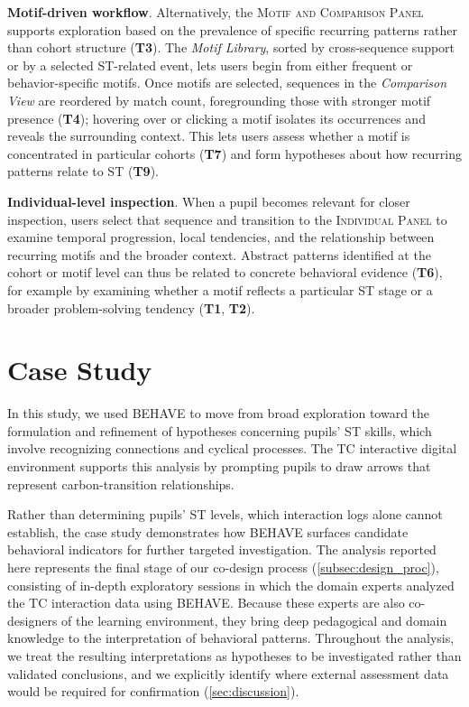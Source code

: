 \documentclass[letterpaper,journal]{IEEEtran}
\begin{document}
\noindent
\textbf{Motif-driven workflow}.
Alternatively, the \textsc{Motif and Comparison Panel} supports exploration based on the prevalence of specific recurring patterns rather than cohort structure (\textbf{T3}).
The \textit{Motif Library}, sorted by cross-sequence support or by a selected ST-related event, lets users begin from either frequent or behavior-specific motifs. 
Once motifs are selected, sequences in the \textit{Comparison View} are reordered by match count, foregrounding those with stronger motif presence (\textbf{T4}); hovering over or clicking a motif isolates its occurrences and reveals the surrounding context.
This lets users assess whether a motif is concentrated in particular cohorts (\textbf{T7}) and form hypotheses about how recurring patterns relate to ST (\textbf{T9}).

\noindent
\textbf{Individual-level inspection}.
When a pupil becomes relevant for closer inspection, users select that sequence and transition to the \textsc{Individual Panel} to examine temporal progression, local tendencies, and the relationship between recurring motifs and the broader context. 
Abstract patterns identified at the cohort or motif level can thus be related to concrete behavioral evidence (\textbf{T6}), for example by examining whether a motif reflects a particular ST stage or a broader problem-solving tendency (\textbf{T1}, \textbf{T2}).






\section{Case Study}
\label{sec:case_study}
In this study, we used \textsc{BEHAVE} to move from broad exploration toward the formulation and refinement of hypotheses concerning pupils' ST skills, which involve recognizing connections and cyclical processes.
The TC interactive digital environment supports this analysis by prompting pupils to draw arrows that represent carbon-transition relationships.

Rather than determining pupils' ST levels, which interaction logs alone cannot establish, the case study demonstrates how \textsc{BEHAVE} surfaces candidate behavioral indicators for further targeted investigation.
The analysis reported here represents the final stage of our co-design process (\cref{subsec:design_proc}), consisting of in-depth exploratory sessions in which the domain experts analyzed the TC interaction data using \textsc{BEHAVE}. 
Because these experts are also co-designers of the learning environment, they bring deep pedagogical and domain knowledge to the interpretation of behavioral patterns. 
Throughout the analysis, we treat the resulting interpretations as hypotheses to be investigated rather than validated conclusions, and we explicitly identify where external assessment data would be required for confirmation (\cref{sec:discussion}). 
\end{document}
